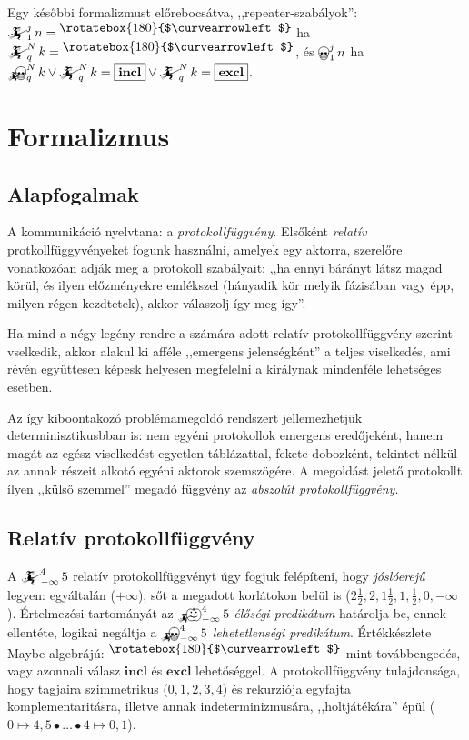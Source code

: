 \documentclass{article}
\newcommand{\nothing}{\text{\raisebox{0.4em}{\rotatebox{180}{$\curvearrowleft$}}}}%
\newcommand{\just}[1]{\boxed{#1}}%
\newcommand{\incl}{\mathbf{incl}}
\newcommand{\excl}{\mathbf{excl}}
\newcommand{\mainfun}[3]{\mathwitch_{#1}^{#2}#3}
\newcommand{\nomainfun}[3]{\bigskull_{#1}^{#2}#3}
\newcommand{\mainfunA}[3]{\mathwitch_{#2}^{#1}#3}
\newcommand{\nomainfunA}[3]{{}_{\mathwitch}\!\!\!\!\bigskull^{#1}_{#2}#3}
\newcommand{\yesmainfunA}[3]{{}_{\mathwitch}\!\!\!\!\bigpumpkin^{#1}_{#2}#3}
\begin{document}
	Egy későbbi formalizmust előrebocsátva, ,,repeater-szabályok'': $\mainfun1jn = \nothing$ ha $\mainfunA Nqk = \nothing$, és $\nomainfun1jn$ ha $\nomainfunA Nqk \lor \mainfunA Nqk = \just\incl \lor \mainfunA Nqk = \just\excl$.

	\section{Formalizmus}

	\subsection{Alapfogalmak}

	A kommunikáció nyelvtana: a \emph{protokollfüggvény}. Elsőként \emph{relatív} protkollfüggyvényeket fogunk használni, amelyek egy aktorra, szerelőre vonatkozóan adják meg a protokoll szabályait: ,,ha ennyi bárányt látsz magad körül, és ilyen előzményekre emlékszel (hányadik kör melyik fázisában vagy épp, milyen régen kezdtetek), akkor válaszolj így meg így''.

	Ha mind a négy legény rendre a számára adott relatív protokollfüggvény szerint vselkedik, akkor alakul ki afféle ,,emergens jelenségként'' a teljes viselkedés, ami révén együttesen képesk helyesen megfelelni a királynak mindenféle lehetséges esetben.

	Az így kiboontakozó problémamegoldó rendszert jellemezhetjük determinisztikusbban is: nem egyéni protokollok emergens eredőjeként, hanem magát az egész viselkedést egyetlen táblázattal, fekete dobozként, tekintet nélkül az annak részeit alkotó egyéni aktorok szemszögére. A megoldást jelető protokollt ílyen ,,külső szemmel'' megadó függvény az \emph{abszolút protokollfüggvény}.

	\subsection{Relatív protokollfüggvény}

	A $\mainfunA4{-\infty}5$ relatív protokollfüggvényt úgy fogjuk felépíteni, hogy \emph{jóslóerejű} legyen: egyáltalán ($+\infty$), sőt a megadott korlátokon belül is ($2\frac12, 2, 1\frac12, 1, \frac12, 0, -\infty$). Értelmezési tartományát az $\yesmainfunA4{-\infty}5$ \emph{élőségi predikátum} határolja be, ennek ellentéte, logikai negáltja a $\nomainfunA4{-\infty}5$ \emph{lehetetlenségi predikátum}. Értékkészlete Maybe-algebrájú: $\nothing$ mint továbbengedés, vagy azonnali válasz $\just\incl$ és $\just\excl$ lehetőséggel. A protokollfüggvény tulajdonsága, hogy tagjaira szimmetrikus ($0, 1, 2, 3,4$) és rekurziója egyfajta komplementaritásra, illetve annak indeterminizmusára, ,,holtjátékára'' épül ($0 \mapsto 4, 5 \bullet \dots \bullet 4 \mapsto 0, 1$).
\end{document}
